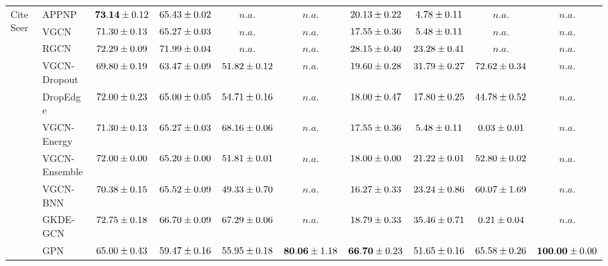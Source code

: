 \begin{table*}[!h]
{\begin{tabular}{ll|cccc|cccc}
        
        \midrule
        
        \multirow{10}{*}{CiteSeer}
        & APPNP & ${\mathbf{73.14}\tiny \pm 0.12}$ & ${65.43\tiny \pm 0.02}$ & $n.a.$ & $n.a.$ & ${20.13\tiny \pm 0.22}$ & ${4.78\tiny \pm 0.11}$ & $n.a.$ & $n.a.$\\
        & VGCN & ${71.30\tiny \pm 0.13}$ & ${65.27\tiny \pm 0.03}$ & $n.a.$ & $n.a.$ & ${17.55\tiny \pm 0.36}$ & ${5.48\tiny \pm 0.11}$ & $n.a.$ & $n.a.$\\
        & RGCN & ${72.29\tiny \pm 0.09}$ & ${{71.99}\tiny \pm 0.04}$ & $n.a.$ & $n.a.$ & ${28.15\tiny \pm 0.40}$ & ${23.28\tiny \pm 0.41}$ & $n.a.$ & $n.a.$\\
        & VGCN-Dropout & ${69.80\tiny \pm 0.19}$ & ${63.47\tiny \pm 0.09}$ & ${51.82\tiny \pm 0.12}$ & $n.a.$ & ${19.60\tiny \pm 0.28}$ & ${31.79\tiny \pm 0.27}$ & ${{72.62}\tiny \pm 0.34}$ & $n.a.$\\
        & DropEdge & ${72.00\tiny \pm 0.23}$ & ${65.00\tiny \pm 0.05}$ & ${54.71\tiny \pm 0.16}$ & $n.a.$ & ${18.00\tiny \pm 0.47}$ & ${17.80\tiny \pm 0.25}$ & ${44.78\tiny \pm 0.52}$ & $n.a.$\\
        & VGCN-Energy & ${71.30\tiny \pm 0.13}$ & ${65.27\tiny \pm 0.03}$ & ${{68.16}\tiny \pm 0.06}$ & $n.a.$ & ${17.55\tiny \pm 0.36}$ & ${5.48\tiny \pm 0.11}$ & ${0.03\tiny \pm 0.01}$ & $n.a.$\\
        & VGCN-Ensemble & ${72.00\tiny \pm 0.00}$ & ${65.20\tiny \pm 0.00}$ & ${51.81\tiny \pm 0.01}$ & $n.a.$ & ${18.00\tiny \pm 0.00}$ & ${21.22\tiny \pm 0.01}$ & ${52.80\tiny \pm 0.02}$ & $n.a.$\\
        & VGCN-BNN & ${70.38\tiny \pm 0.15}$ & ${65.52\tiny \pm 0.09}$ & ${49.33\tiny \pm 0.70}$ & $n.a.$ & ${16.27\tiny \pm 0.33}$ & ${23.24\tiny \pm 0.86}$ & ${60.07\tiny \pm 1.69}$ & $n.a.$\\
        & GKDE-GCN & ${72.75\tiny \pm 0.18}$ & ${66.70\tiny \pm 0.09}$ & ${67.29\tiny \pm 0.06}$ & $n.a.$ & ${18.79\tiny \pm 0.33}$ & ${35.46\tiny \pm 0.71}$ & ${0.21\tiny \pm 0.04}$ & $n.a.$\\
        & GPN & ${65.00\tiny \pm 0.43}$ & ${59.47\tiny \pm 0.16}$ & ${55.95\tiny \pm 0.18}$ & ${\mathbf{80.06}\tiny \pm 1.18}$ & ${\mathbf{66.70}\tiny \pm 0.23}$ & ${51.65\tiny \pm 0.16}$ & ${65.58\tiny \pm 0.26}$ & ${\mathbf{100.00}\tiny \pm 0.00}$\\


\end{tabular}}
\end{table*}
